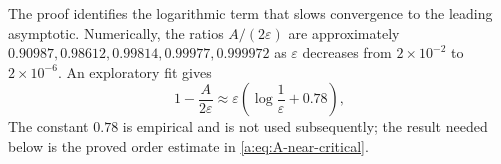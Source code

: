 The proof identifies the logarithmic term that slows convergence to the leading
asymptotic.  Numerically, the ratios \(A/(2\varepsilon)\) are approximately
\(0.90987,0.98612,0.99814,0.99977,0.999972\) as \(\varepsilon\) decreases from
\(2\times10^{-2}\) to \(2\times10^{-6}\).  An exploratory fit gives
\begin{equation}
  1-\frac{A}{2\varepsilon}
  \approx\varepsilon\left(\log\frac1\varepsilon+0.78\right),
  \label{a:eq:A-empirical-correction}
\end{equation}
The constant \(0.78\) is empirical and is not used subsequently; the result needed
below is the proved order estimate in \cref{a:eq:A-near-critical}.
